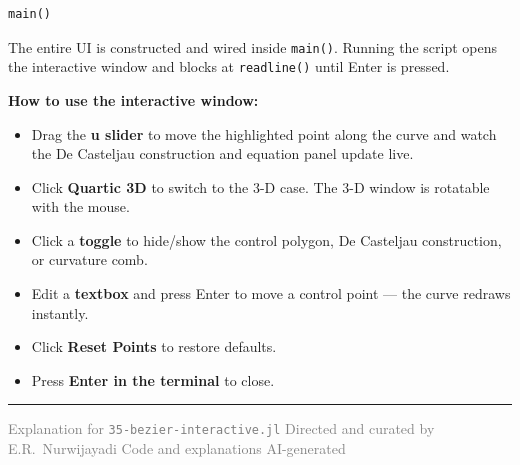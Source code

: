 \documentclass[12pt, a4paper]{article}
\newcommand{\cd}[1]{\texttt{#1}}
\begin{document}
\begin{verbatim}
main()
\end{verbatim}

The entire UI is constructed and wired inside \cd{main()}.
Running the script opens the interactive window and
blocks at \cd{readline()} until Enter is pressed.

\begin{notebox}
\textbf{How to use the interactive window:}
\begin{itemize}
  \item Drag the \textbf{u slider} to move the highlighted
        point along the curve and watch the De Casteljau
        construction and equation panel update live.
  \item Click \textbf{Quartic 3D} to switch to the 3-D case.
        The 3-D window is rotatable with the mouse.
  \item Click a \textbf{toggle} to hide/show the control
        polygon, De Casteljau construction, or curvature comb.
  \item Edit a \textbf{textbox} and press Enter to move a
        control point --- the curve redraws instantly.
  \item Click \textbf{Reset Points} to restore defaults.
  \item Press \textbf{Enter in the terminal} to close.
\end{itemize}
\end{notebox}

\vspace{2em}\hrule\vspace{0.5em}
{\small\textcolor{gray}{%
Explanation for \texttt{35-bezier-interactive.jl}
\textbar{} Directed and curated by E.R.\ Nurwijayadi
\textbar{} Code and explanations AI-generated}}
\end{document}
